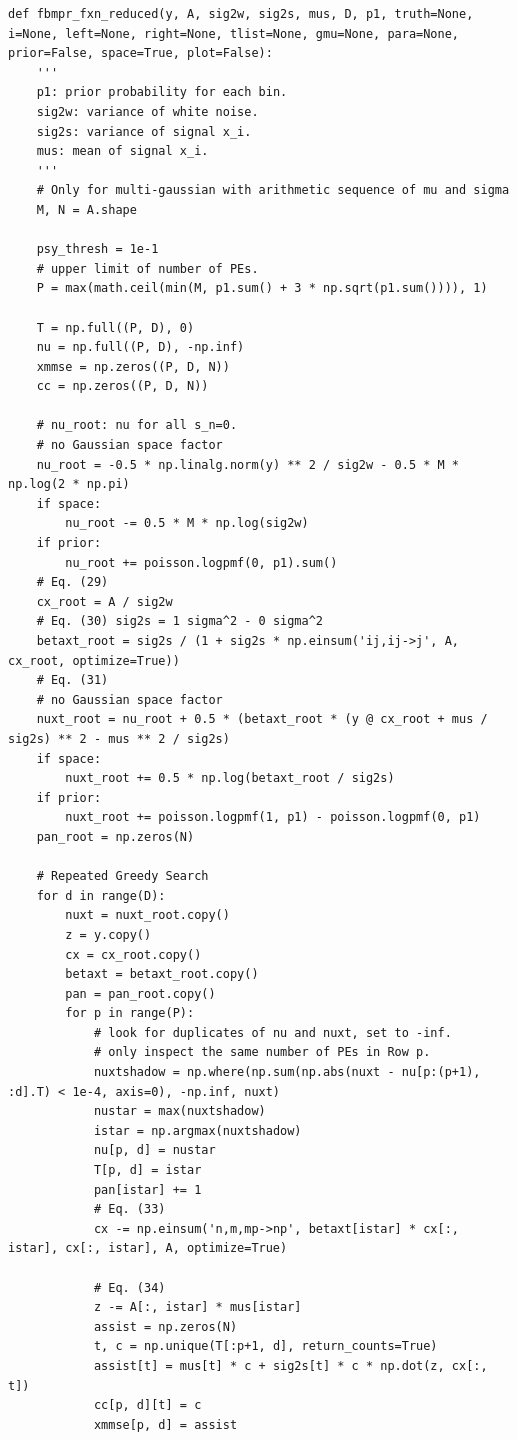\documentclass[notitlepage]{article}
\begin{document}
\begin{lstlisting}
def fbmpr_fxn_reduced(y, A, sig2w, sig2s, mus, D, p1, truth=None, i=None, left=None, right=None, tlist=None, gmu=None, para=None, prior=False, space=True, plot=False):
    '''
    p1: prior probability for each bin.
    sig2w: variance of white noise.
    sig2s: variance of signal x_i.
    mus: mean of signal x_i.
    '''
    # Only for multi-gaussian with arithmetic sequence of mu and sigma
    M, N = A.shape

    psy_thresh = 1e-1
    # upper limit of number of PEs.
    P = max(math.ceil(min(M, p1.sum() + 3 * np.sqrt(p1.sum()))), 1)

    T = np.full((P, D), 0)
    nu = np.full((P, D), -np.inf)
    xmmse = np.zeros((P, D, N))
    cc = np.zeros((P, D, N))

    # nu_root: nu for all s_n=0.
    # no Gaussian space factor
    nu_root = -0.5 * np.linalg.norm(y) ** 2 / sig2w - 0.5 * M * np.log(2 * np.pi)
    if space:
        nu_root -= 0.5 * M * np.log(sig2w)
    if prior:
        nu_root += poisson.logpmf(0, p1).sum()
    # Eq. (29)
    cx_root = A / sig2w
    # Eq. (30) sig2s = 1 sigma^2 - 0 sigma^2
    betaxt_root = sig2s / (1 + sig2s * np.einsum('ij,ij->j', A, cx_root, optimize=True))
    # Eq. (31)
    # no Gaussian space factor
    nuxt_root = nu_root + 0.5 * (betaxt_root * (y @ cx_root + mus / sig2s) ** 2 - mus ** 2 / sig2s)
    if space:
        nuxt_root += 0.5 * np.log(betaxt_root / sig2s)
    if prior:
        nuxt_root += poisson.logpmf(1, p1) - poisson.logpmf(0, p1)
    pan_root = np.zeros(N)

    # Repeated Greedy Search
    for d in range(D):
        nuxt = nuxt_root.copy()
        z = y.copy()
        cx = cx_root.copy()
        betaxt = betaxt_root.copy()
        pan = pan_root.copy()
        for p in range(P):
            # look for duplicates of nu and nuxt, set to -inf.
            # only inspect the same number of PEs in Row p.
            nuxtshadow = np.where(np.sum(np.abs(nuxt - nu[p:(p+1), :d].T) < 1e-4, axis=0), -np.inf, nuxt)
            nustar = max(nuxtshadow)
            istar = np.argmax(nuxtshadow)
            nu[p, d] = nustar
            T[p, d] = istar
            pan[istar] += 1
            # Eq. (33)
            cx -= np.einsum('n,m,mp->np', betaxt[istar] * cx[:, istar], cx[:, istar], A, optimize=True)

            # Eq. (34)
            z -= A[:, istar] * mus[istar]
            assist = np.zeros(N)
            t, c = np.unique(T[:p+1, d], return_counts=True)
            assist[t] = mus[t] * c + sig2s[t] * c * np.dot(z, cx[:, t])
            cc[p, d][t] = c
            xmmse[p, d] = assist


\end{lstlisting}
\end{document}
